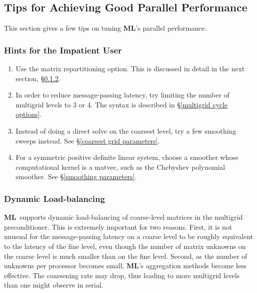 \documentclass{article}[11pt]
\newcommand{\ML}     {{\bf ML}}
\newcommand{\be}  {\begin{enumerate}}
\newcommand{\ee}  {\end{enumerate}}
\begin{document}
\subsection{Tips for Achieving Good Parallel Performance}
\label{parallel performance}
%
This section gives a few tips on tuning \ML's parallel performance.

\subsubsection{Hints for the Impatient User}

\be
   \item Use the matrix repartitioning option.   This is discussed in detail
in the next section, \S\ref{dynamic load balancing}.
   \item In order to reduce message-passing latency, try limiting the number
of multigrid levels to 3 or 4.  The syntax is described in
\S\ref{multigrid cycle options}.
   \item Instead of doing a direct solve on the coarsest level, try a few
smoothing sweeps instead.  See \S\ref{coarsest grid parameters}.
   \item For a symmetric positive definite linear system, choose a
smoother  whose computational kernel is a matvec, such as the Chebyshev
polynomial smoother.  See \S\ref{smoothing parameters}.
\ee

\subsubsection{Dynamic Load-balancing} \label{dynamic load balancing}
\ML\ supports dynamic load-balancing of coarse-level matrices in the multigrid
preconditioner.
This is extremely important for two reasons.
First, it is not unusual for the message-passing latency on a coarse level
to be roughly equivalent to the latency of the fine level,
even though the number of matrix unknowns on the coarse level is much smaller
than on the fine level.
Second, as the number of unknowns per processor becomes small, \ML's
aggregation methods become less effective.
The coarsening rate may drop, thus leading to more multigrid levels than one
might observe in serial.
\end{document}
